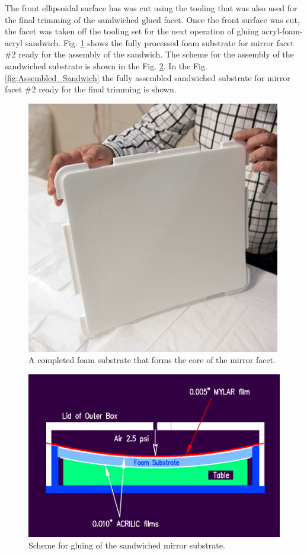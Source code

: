 The front ellipsoidal surface has was cut using the tooling that was also used for the final trimming of the sandwiched glued facet. Once the front surface was cut, the facet was taken off the tooling set for the next operation of gluing acryl-foam-acryl sandwich. Fig. \ref{fig:Foam_Sub} shows the fully processed foam substrate for mirror facet \#2 ready for the assembly of the sandwich. The scheme for the assembly of the sandwiched substrate is shown in the Fig. \ref{fig:Gluing_Sandwich}. In the Fig. \ref{fig:Assembled_Sandwich} the fully assembled sandwiched substrate for mirror facet \#2 ready for the final trimming is shown. 

\begin{figure}[ht]
    \centering
    \includegraphics[width=0.9\linewidth]{images/Foam_Sub.png}
    \caption{A completed foam substrate that forms the core of the mirror facet.}
    \label{fig:Foam_Sub}
\end{figure}

\begin{figure}[ht]
    \centering
    \includegraphics[width=0.9\linewidth]{images/Gluing_Sandwich_New.png}
    \caption{Scheme for gluing of the sandwiched mirror substrate.}
    \label{fig:Gluing_Sandwich}
\end{figure}
 

